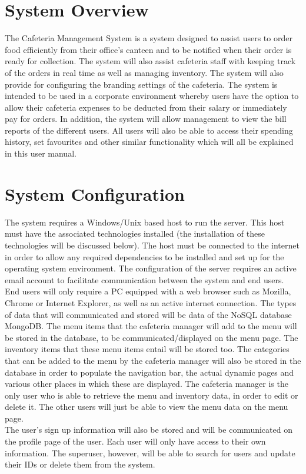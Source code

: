 \documentclass[a4paper,12pt]{report}
\begin{document}
\section{System Overview}
The Cafeteria Management System is a system designed to assist users to order food efficiently from their office's canteen and to be notified when their order is ready for collection. The system will also assist cafeteria staff with keeping track of the orders in real time as well as managing inventory. The system will also provide for configuring the branding settings of the cafeteria. The system is intended to be used in a corporate environment whereby users have the option to allow their cafeteria expenses to be deducted from their salary or immediately pay for orders. In addition, the system will allow management to view the bill reports of the different users. All users will also be able to access their spending history, set favourites and other similar functionality which will all be explained in this user manual. \\

\section{System Configuration}
The system requires a Windows/Unix based host to run the server. This host must have the associated technologies installed (the installation of these technologies will be discussed below). The host must be connected to the internet in order to allow any required dependencies to be installed and set up for the operating system environment. The configuration of the server requires an active email account to facilitate communication between the system and end users. 
End users will only require a PC equipped with a web browser such as Mozilla, Chrome or Internet Explorer, as well as an active internet connection.  
The types of data that will communicated and stored will be data of the NoSQL database MongoDB. The menu items that the cafeteria manager will add to the menu will be stored in the database, to be communicated/displayed on the menu page. The inventory items that these menu items entail will be stored too. The categories that can be added to the menu by the cafeteria manager will also be stored in the database in order to populate the navigation bar, the actual dynamic pages and various other places in which these are displayed. The cafeteria manager is the only user who is able to retrieve the menu and inventory data, in order to edit or delete it. The other users will just be able to view the menu data on the menu page. 
\\
The user's sign up information will also be stored and will be communicated on the profile page of the user. Each user will only have access to their own information. The superuser, however, will be able to search for users and update their IDs or delete them from the system.
\\
\end{document}

